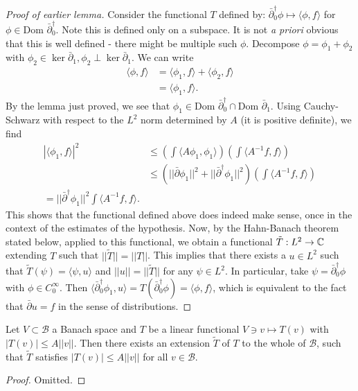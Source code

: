 \documentclass{../mathnotes}
\begin{document}
\begin{proof}[Proof of earlier lemma]
    Consider the functional $T$ defined by: $\bar\partial_0^\dagger\phi\mapsto\langle\phi,f\rangle$ for $\phi\in\text{Dom }\bar\partial_0^\dagger$.
    Note this is defined only on a subspace.
    It is not \textit{a priori} obvious that this is well defined - there might be multiple such $\phi$. Decompose $\phi=\phi_1+\phi_2$
    with $\phi_2\in\ker\bar\partial_1,\phi_2\perp\ker\bar\partial_1$. We can write 
    \begin{align*}
        \langle\phi,f\rangle&=\langle\phi_1,f\rangle+\langle\phi_2,f\rangle\\
        &=\langle\phi_1,f\rangle.
    \end{align*}
    By the lemma just proved, we see that $\phi_1\in\text{Dom }\bar\partial_0^\dagger\cap\text{Dom }\bar\partial_1$.
    Using Cauchy-Schwarz with respect to the $L^2$ norm determined by $A$ (it is positive definite), we find
    \begin{align*}
        |\langle\phi_1,f\rangle|^2&\leq\left( \int\langle A\phi_1,\phi_1\rangle \right)\left( \int\langle A^{-1}f,f\rangle\right)\\
        &\leq\left( ||\bar\partial\phi_1||^2+||\bar\partial^\dagger\phi_1||^2 \right)\left( \int\langle A^{-1}f,f\rangle\right)\\
        =||\bar\partial^\dagger\phi_1||^2\int\langle A^{-1}f,f\rangle.
    \end{align*}
    This shows that the functional defined above does indeed make sense, once in the context of the estimates of the hypothesis.
    Now, by the Hahn-Banach theorem stated below, applied to this functional, we obtain a functional $\tilde T:L^2\to \mathbb{C}$
    extending $T$ such that $||\tilde T||=||T||$. This implies that there exists a $u\in L^2$ such that $\tilde T(\psi)=\langle\psi,u\rangle$
    and $||u||=||\tilde T||$ for any $\psi\in L^2$. In particular, take $\psi=\bar\partial_0^\dagger\phi$ with $\phi\in C_0^\infty$.
    Then $\langle\bar\partial_0^\dagger\phi_1,u\rangle=T(\bar\partial_0^\dagger\phi)=\langle\phi,f\rangle$, which is equivalent
    to the fact that $\bar\partial u=f$ in the sense of distributions.
\end{proof}

\begin{thm}
    Let $V\subset\mathcal{B}$ a Banach space and $T$ be a linear functional $V\ni v\mapsto T(v)$
    with $|T(v)|\leq A||v||$. Then there exists an extension $\tilde T$ of $T$ to the whole of $\mathcal{B}$,
    such that $\tilde T$ satisfies $|T(v)|\leq A||v||$ for all $v\in\mathcal{B}$.
\end{thm}
\begin{proof}
    Omitted.
\end{proof}
\end{document}
